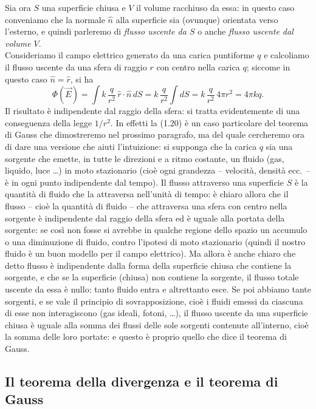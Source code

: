 Sia ora $S$ una superficie chiusa e $V$ il volume racchiuso da essa: in questo
caso conveniamo che la normale $\hat n$ alla superficie sia (ovunque) orientata
verso l'esterno, e quindi
parleremo di \emph{flusso uscente da $S$} o anche \emph{flusso uscente dal
volume $V$}.\\
Consideriamo il campo elettrico generato da una carica puntiforme $q$ e
calcoliamo il flusso uscente da una sfera di raggio $r$ con centro nella carica
$q$; siccome in questo caso $\hat n=\hat r$, si ha
\begin{equation}
  \Phi(\vec E)=\int k\,\frac{q}{r^2}\,\hat r\cdot\hat n\,dS
  =k\,\frac{q}{r^2}\int dS=k\,\frac{q}{r^2}\,4\pi r^2=4\pi kq.
  \tag{1.20}
\end{equation}
Il risultato \`e indipendente dal raggio della sfera: si tratta evidentemente di
una conseguenza della legge $1/r^2$. In effetti la (1.20) \`e un caso
particolare del teorema di Gauss che dimostreremo nel prossimo paragrafo, ma del
quale cercheremo ora di dare una versione che aiuti l'intuizione: si supponga
che la carica $q$ sia una sorgente che emette, in tutte le direzioni e a ritmo
costante, un fluido (gas, liquido, luce \dots) in moto stazionario (cio\`e ogni
grandezza -- velocit\`a, densit\`a ecc.\ -- \`e in ogni punto indipendente dal
tempo). Il flusso attraverso una superficie $S$ \`e la quantit\`a di fluido che
la attraversa nell'unit\`a di tempo: \`e chiaro allora che il flusso -- cio\`e
la quantit\`a di fluido -- che attraversa una sfera con centro nella sorgente
\`e indipendente dal raggio della sfera ed \`e uguale alla portata della
sorgente: se cos\`i non fosse si avrebbe in qualche regione dello spazio un
accumulo o una diminuzione di fluido, contro l'ipotesi di moto stazionario
(quindi il nostro fluido \`e un buon modello per il campo elettrico). Ma allora
\`e anche chiaro che detto flusso \`e indipendente dalla forma della superficie
chiusa che contiene la sorgente, e che se la superficie (chiusa) non contiene la
sorgente, il flusso totale uscente da essa \`e nullo: tanto fluido entra e
altrettanto esce. Se poi abbiamo tante sorgenti, e se vale il principio di
sovrapposizione, cio\`e i fluidi emessi da ciascuna di esse non interagiscono
(gas ideali, fotoni, \dots), il flusso uscente da una superficie chiusa \`e
uguale alla somma dei flussi delle sole sorgenti contenute all'interno, cio\`e
la somma delle loro portate: e questo \`e proprio quello che dice il teorema di
Gauss.

\subsection{Il teorema della divergenza e il teorema di Gauss}

